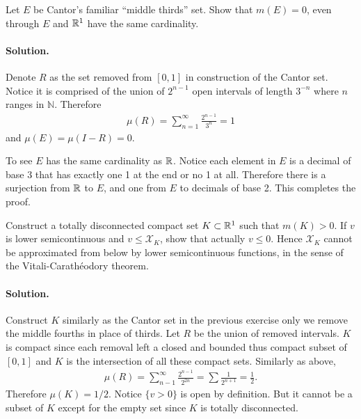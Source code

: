 \documentclass[../main.tex]{subfiles}
\begin{document}
 \begin{exercise}
   Let $ E $ be Cantor's familiar ``middle thirds'' set. Show that $ m(E) = 0 $, even through $ E $ and $ \mathbb R ^{1}  $ have the same cardinality.
   \paragraph{Solution. }
   Denote $ R $ as the set removed from $ [0, 1] $ in construction of the Cantor set. Notice it is comprised of the union of $ 2 ^{n-1} $ open intervals of length $ 3 ^{-n} $ where $ n $ ranges in $ \mathbb{N} $. Therefore
   \begin{align*}
     \mu(R) = \sum_{n=1}^{\infty} \frac {2 ^{n-1}}{3^n} = 1
   \end{align*}
   and $ \mu(E) = \mu(I - R) = 0 $.

   To see $ E $ has the same cardinality as $ \mathbb R $. Notice each element in $ E $ is a decimal of base 3 that has exactly one 1 at the end or no 1 at all. Therefore there is a surjection from $ \mathbb R $ to $ E $, and one from $ E $ to decimals of base 2. This completes the proof.

 \end{exercise}

 \begin{exercise}
   Construct a totally disconnected compact set $ K \subset \mathbb R^1 $ such that $ m(K) > 0 $. If $ v $ is lower semicontinuous and $ v \le \mathcal{X}_K $, show that actually $ v \le 0 $. Hence $ \mathcal{X}_K $ cannot be approximated from below by lower semicontinuous functions, in the sense of the Vitali-Carath\'eodory theorem.
   \paragraph{Solution. }
   Construct $ K $ similarly as the Cantor set in the previous exercise only we remove the middle fourths in place of thirds. Let $ R $ be the union of removed intervals. $ K $ is compact since each removal left a closed and bounded thus compact subset of $ [0, 1] $ and $ K $ is the intersection of all these compact sets. Similarly as above,
   \begin{align*}
     \mu(R) = \sum_{n-1}^{\infty} \frac {2 ^{n-1} }{2 ^{2n} } = \sum \frac {1}{2 ^{n+1} } = \frac {1}{2} .
   \end{align*}
   Therefore $ \mu(K) = 1/2 $. Notice $ \{v > 0\} $ is open by definition. But it cannot be a subset of $ K $ except for the empty set since $ K $ is totally disconnected.

 \end{exercise}
\end{document}
